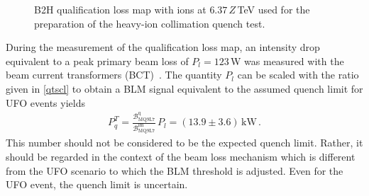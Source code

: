 \begin{figure}[b]
  \centering
  \caption{B2H qualification loss map with \lead ions at $6.37\,Z\,$TeV used for the preparation of the heavy-ion collimation quench test.}  
  \label{pic:16090710}
  \end{figure}


During the measurement of the qualification loss map, an intensity drop equivalent to a peak primary beam loss of $P_l=123\,$W was measured with the beam current transformers (BCT)~\cite{BIW10:TUPSM051}. The quantity $P_l$ can be scaled with the ratio given in \eqref{qtscl} to obtain a BLM signal equivalent to the assumed quench limit for UFO events yields
%
\begin{align}
  P_q^T = \frac{\mathcal{B}_\text{MQ9L7}^\text{q}}{\mathcal{B}_\text{MQ9L7}^\text{lm}} \, P_l = (13.9 \pm 3.6) \, \text{kW} \, . \label{eq:peakloss}
\end{align}
%
This number should not be considered to be the expected quench limit. Rather, it should be regarded in the context of the beam loss mechanism which is different from the UFO scenario to which the BLM threshold is adjusted. Even for the UFO event, the quench limit is uncertain. 

